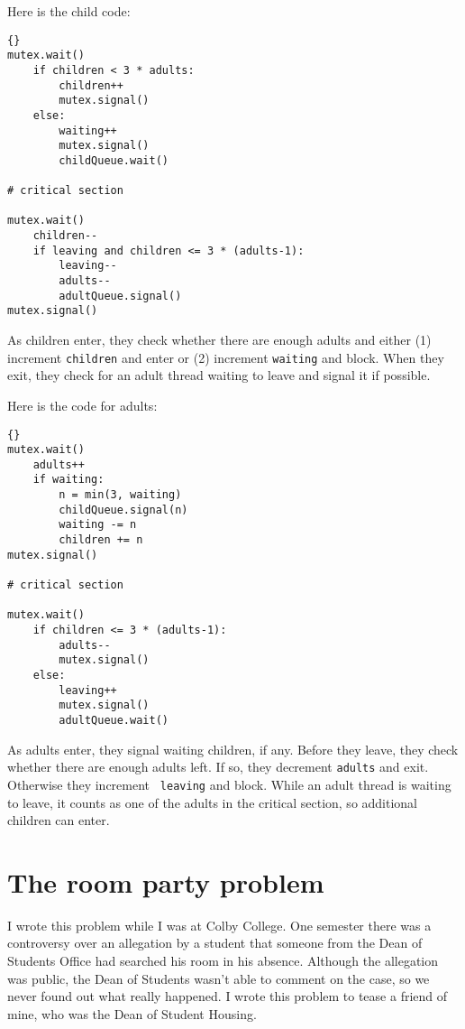 \documentclass{book}
\begin{document}
Here is the child code:

\begin{lstlisting}[title={Extended child care solution (child)}]{}
mutex.wait()
    if children < 3 * adults:
        children++
        mutex.signal()
    else:
        waiting++
        mutex.signal()
        childQueue.wait()

# critical section

mutex.wait()
    children--
    if leaving and children <= 3 * (adults-1):
        leaving--
        adults--
        adultQueue.signal() 
mutex.signal()
\end{lstlisting}

As children enter, they check whether there are enough adults
and either (1) increment {\tt children} and enter or (2) increment
{\tt waiting} and block.
When they exit, they check for an adult thread waiting to leave and
signal it if possible.

\newpage
Here is the code for adults:

\begin{lstlisting}[title={Extended child care solution (adult)}]{}
mutex.wait()
    adults++
    if waiting:
        n = min(3, waiting)
        childQueue.signal(n)
        waiting -= n
        children += n
mutex.signal()

# critical section

mutex.wait()
    if children <= 3 * (adults-1):
        adults--
        mutex.signal()
    else:
        leaving++
        mutex.signal()
        adultQueue.wait() 
\end{lstlisting}

As adults enter, they signal waiting children, if any.  Before they
leave, they check whether there are enough adults left.  If so, they
decrement {\tt adults} and exit.  Otherwise they increment {\tt
leaving} and block.  While an adult thread is waiting to leave, it
counts as one of the adults in the critical section, so additional
children can enter.





\newpage
\section{The room party problem}

I wrote this problem while I was at Colby College.  One semester
there was a controversy over an allegation by a student that someone
from the Dean of Students Office had searched his room in his
absence.  Although the allegation was public, the Dean of Students
wasn't able to comment on the case, so we never found out what
really happened.  I wrote this problem to tease a friend of mine,
who was the Dean of Student Housing.
\end{document}
